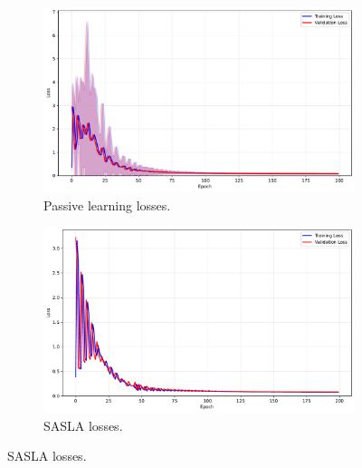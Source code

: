 \documentclass[10pt, conference]{IEEEtran}
\begin{document}
\begin{figure}[!t]
	\centering
	\caption{Losses for training of frameworks with the California housing dataset.}
	
	\begin{subfigure}{\linewidth}
		\centering
		\includegraphics[width=\linewidth]{../results/housing/losses.pdf}
		\caption{Passive learning losses.}
		\label{fig:losses_housing}
	\end{subfigure}
	
	\vspace{0.1em}
	
	\begin{subfigure}{\linewidth}
		\centering
		\includegraphics[width=\linewidth]{../results/housing/os_losses.pdf}
		\caption{SASLA losses.}
		\label{fig:os_losses_housing}
	\end{subfigure}
	
	\vspace{0.1em}
	

\end{figure}
\end{document}
